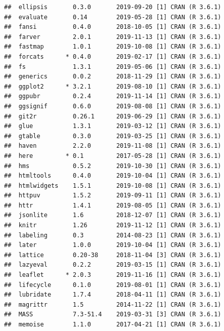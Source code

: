 \documentclass[]{book}
\begin{document}
\begin{verbatim}
##  ellipsis       0.3.0       2019-09-20 [1] CRAN (R 3.6.1)                   
##  evaluate       0.14        2019-05-28 [1] CRAN (R 3.6.1)                   
##  fansi          0.4.0       2018-10-05 [1] CRAN (R 3.6.1)                   
##  farver         2.0.1       2019-11-13 [1] CRAN (R 3.6.1)                   
##  fastmap        1.0.1       2019-10-08 [1] CRAN (R 3.6.1)                   
##  forcats      * 0.4.0       2019-02-17 [1] CRAN (R 3.6.1)                   
##  fs             1.3.1       2019-05-06 [1] CRAN (R 3.6.1)                   
##  generics       0.0.2       2018-11-29 [1] CRAN (R 3.6.1)                   
##  ggplot2      * 3.2.1       2019-08-10 [1] CRAN (R 3.6.1)                   
##  ggpubr         0.2.4       2019-11-14 [1] CRAN (R 3.6.1)                   
##  ggsignif       0.6.0       2019-08-08 [1] CRAN (R 3.6.1)                   
##  git2r          0.26.1      2019-06-29 [1] CRAN (R 3.6.1)                   
##  glue           1.3.1       2019-03-12 [1] CRAN (R 3.6.1)                   
##  gtable         0.3.0       2019-03-25 [1] CRAN (R 3.6.1)                   
##  haven          2.2.0       2019-11-08 [1] CRAN (R 3.6.1)                   
##  here         * 0.1         2017-05-28 [1] CRAN (R 3.6.1)                   
##  hms            0.5.2       2019-10-30 [1] CRAN (R 3.6.1)                   
##  htmltools      0.4.0       2019-10-04 [1] CRAN (R 3.6.1)                   
##  htmlwidgets    1.5.1       2019-10-08 [1] CRAN (R 3.6.1)                   
##  httpuv         1.5.2       2019-09-11 [1] CRAN (R 3.6.1)                   
##  httr           1.4.1       2019-08-05 [1] CRAN (R 3.6.1)                   
##  jsonlite       1.6         2018-12-07 [1] CRAN (R 3.6.1)                   
##  knitr          1.26        2019-11-12 [1] CRAN (R 3.6.1)                   
##  labeling       0.3         2014-08-23 [1] CRAN (R 3.6.1)                   
##  later          1.0.0       2019-10-04 [1] CRAN (R 3.6.1)                   
##  lattice        0.20-38     2018-11-04 [3] CRAN (R 3.6.1)                   
##  lazyeval       0.2.2       2019-03-15 [1] CRAN (R 3.6.1)                   
##  leaflet      * 2.0.3       2019-11-16 [1] CRAN (R 3.6.1)                   
##  lifecycle      0.1.0       2019-08-01 [1] CRAN (R 3.6.1)                   
##  lubridate      1.7.4       2018-04-11 [1] CRAN (R 3.6.1)                   
##  magrittr       1.5         2014-11-22 [1] CRAN (R 3.6.1)                   
##  MASS           7.3-51.4    2019-03-31 [3] CRAN (R 3.6.1)                   
##  memoise        1.1.0       2017-04-21 [1] CRAN (R 3.6.1)                   

\end{verbatim}
\end{document}
